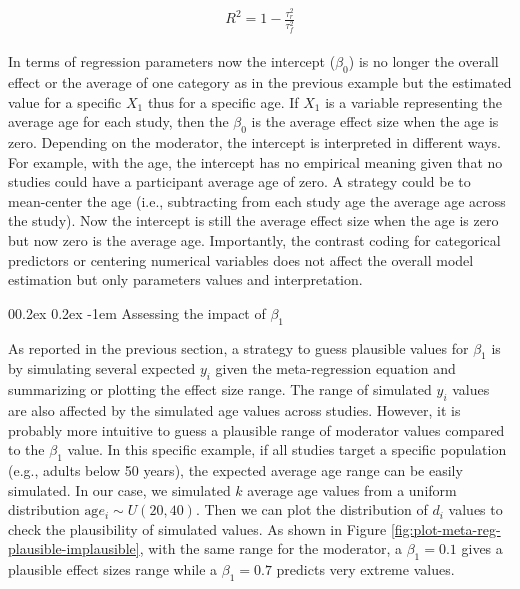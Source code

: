 \documentclass[
  man,floatsintext]{apa6}
\makeatletter
\let\oldparagraph\paragraph
\renewcommand{\paragraph}[1]{\oldparagraph{#1}\mbox{}}
\renewcommand{\paragraph}{\@startsection{paragraph}{4}{\parindent}%
  {0\baselineskip \@plus 0.2ex \@minus 0.2ex}%
  {-1em}%
  {\normalfont\normalsize\bfseries\itshape\typesectitle}}
\makeatother
\begin{document}
\begin{align}
\begin{aligned}
R^2 = 1 - \frac{\tau^2_{r}}{\tau^2_{f}}
\label{eq:rsquared}
\end{aligned}
\end{align}

In terms of regression parameters now the intercept (\(\beta_0\)) is no longer the overall effect or the average of one category as in the previous example but the estimated value for a specific \(X_1\) thus for a specific age. If \(X_1\) is a variable representing the average age for each study, then the \(\beta_0\) is the average effect size when the age is zero. Depending on the moderator, the intercept is interpreted in different ways. For example, with the age, the intercept has no empirical meaning given that no studies could have a participant average age of zero. A strategy could be to mean-center the age (i.e., subtracting from each study age the average age across the study). Now the intercept is still the average effect size when the age is zero but now zero is the average age. Importantly, the contrast coding for categorical predictors or centering numerical variables does not affect the overall model estimation but only parameters values and interpretation.

\hypertarget{assessing-the-impact-of-beta_1}{%
\paragraph{\texorpdfstring{Assessing the impact of \(\beta_1\)}{Assessing the impact of \textbackslash beta\_1}}\label{assessing-the-impact-of-beta_1}}

As reported in the previous section, a strategy to guess plausible values for \(\beta_{1}\) is by simulating several expected \(y_{i}\) given the meta-regression equation and summarizing or plotting the effect size range. The range of simulated \(y_{i}\) values are also affected by the simulated age values across studies. However, it is probably more intuitive to guess a plausible range of moderator values compared to the \(\beta_{1}\) value. In this specific example, if all studies target a specific population (e.g., adults below 50 years), the expected average age range can be easily simulated. In our case, we simulated \(k\) average age values from a uniform distribution \(\text{ag}e_{i} \sim U\left( 20,40 \right)\). Then we can plot the distribution of \(d_{i}\) values to check the plausibility of simulated values. As shown in Figure \ref{fig:plot-meta-reg-plausible-implausible}, with the same range for the moderator, a \(\beta_{1} = 0.1\) gives a plausible effect sizes range while a \(\beta_{1} = 0.7\) predicts very extreme values.
\end{document}

